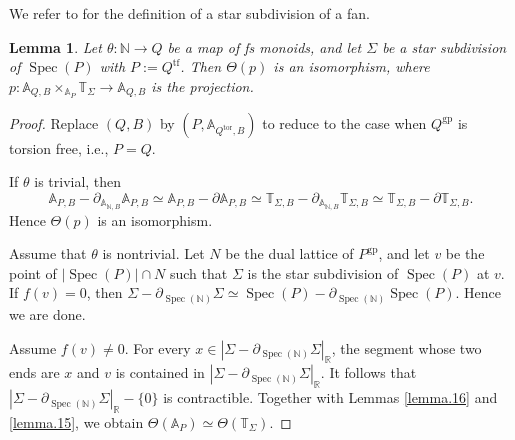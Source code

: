 \documentclass[10pt]{amsart}
\newtheorem{lem}[thm]{Lemma}
\theoremstyle{definition}
\theoremstyle{remark}
\numberwithin{equation}{subsection}
\newcommand{\A}{\mathbb{A}}
\newcommand{\N}{\mathbb{N}}
\newcommand{\R}{\mathbb{R}}
\newcommand{\T}{\mathbb{T}}
\DeclareMathOperator{\Spec}{Spec}
\newcommand{\tor}{\mathrm{tor}}
\newcommand{\tf}{\mathrm{tf}}
\newcommand{\gp}{\mathrm{gp}}
\begin{document}
We refer to \cite[\S 11.1]{CLStoric} for the definition of a star subdivision of a fan.

\begin{lem}
\label{lemma.1}
Let $\theta\colon \N\to Q$ be a map of fs monoids, and let $\Sigma$ be a star subdivision of $\Spec(P)$ with $P:=Q^\tf$.
Then $\Theta(p)$ is an isomorphism, where $p\colon \A_{Q,B}\times_{\A_P}\T_{\Sigma}\to \A_{Q,B}$ is the projection.
\end{lem}
\begin{proof}
Replace $(Q,B)$ by $(P,\A_{Q^\tor,B})$ to reduce to the case when $Q^\gp$ is torsion free, i.e., $P=Q$.

If $\theta$ is trivial, then
\[
\A_{P,B}-\partial_{\A_{\N,B}}\A_{P,B}
\simeq
\A_{P,B}-\partial\A_{P,B}
\simeq 
\T_{\Sigma,B}-\partial_{\A_{\N,B}}\T_{\Sigma,B}
\simeq
\T_{\Sigma,B}-\partial\T_{\Sigma,B}.
\]
Hence $\Theta(p)$ is an isomorphism.

Assume that $\theta$ is nontrivial.
Let $N$ be the dual lattice of $P^\gp$, and let $v$ be the point of $|\Spec(P)|\cap N$ such that $\Sigma$ is the star subdivision of $\Spec(P)$ at $v$.
If $f(v)=0$, then $\Sigma-\partial_{\Spec(\N)}\Sigma\simeq \Spec(P)-\partial_{\Spec(\N)}\Spec(P)$.
Hence we are done.

Assume $f(v)\neq 0$.
For every $x\in |\Sigma-\partial_{\Spec(\N)}\Sigma|_{\R}$, the segment whose two ends are $x$ and $v$ is contained in $|\Sigma-\partial_{\Spec(\N)}\Sigma|_{\R}$.
It follows that $|\Sigma-\partial_{\Spec(\N)}\Sigma|_{\R}-\{0\}$ is contractible.
Together with Lemmas \ref{lemma.16} and \ref{lemma.15}, we obtain $\Theta(\A_P)\simeq \Theta(\T_\Sigma)$.
\end{proof}
\end{document}
